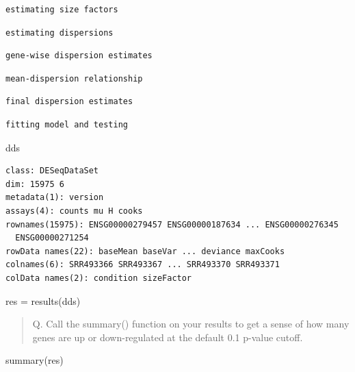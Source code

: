 \documentclass[
  letterpaper,
  DIV=11,
  numbers=noendperiod]{scrartcl}
\newenvironment{Shaded}{\begin{snugshade}}{\end{snugshade}}
\newcommand{\FunctionTok}[1]{\textcolor[rgb]{0.28,0.35,0.67}{#1}}
\newcommand{\NormalTok}[1]{\textcolor[rgb]{0.00,0.23,0.31}{#1}}
\newcommand{\OtherTok}[1]{\textcolor[rgb]{0.00,0.23,0.31}{#1}}
\begin{document}
\begin{verbatim}
estimating size factors
\end{verbatim}

\begin{verbatim}
estimating dispersions
\end{verbatim}

\begin{verbatim}
gene-wise dispersion estimates
\end{verbatim}

\begin{verbatim}
mean-dispersion relationship
\end{verbatim}

\begin{verbatim}
final dispersion estimates
\end{verbatim}

\begin{verbatim}
fitting model and testing
\end{verbatim}

\begin{Shaded}
\begin{Highlighting}[]
\NormalTok{dds}
\end{Highlighting}
\end{Shaded}

\begin{verbatim}
class: DESeqDataSet 
dim: 15975 6 
metadata(1): version
assays(4): counts mu H cooks
rownames(15975): ENSG00000279457 ENSG00000187634 ... ENSG00000276345
  ENSG00000271254
rowData names(22): baseMean baseVar ... deviance maxCooks
colnames(6): SRR493366 SRR493367 ... SRR493370 SRR493371
colData names(2): condition sizeFactor
\end{verbatim}

\begin{Shaded}
\begin{Highlighting}[]
\NormalTok{res }\OtherTok{=} \FunctionTok{results}\NormalTok{(dds)}
\end{Highlighting}
\end{Shaded}

\begin{quote}
Q. Call the summary() function on your results to get a sense of how
many genes are up or down-regulated at the default 0.1 p-value cutoff.
\end{quote}

\begin{Shaded}
\begin{Highlighting}[]
\FunctionTok{summary}\NormalTok{(res)}
\end{Highlighting}
\end{Shaded}
\end{document}
